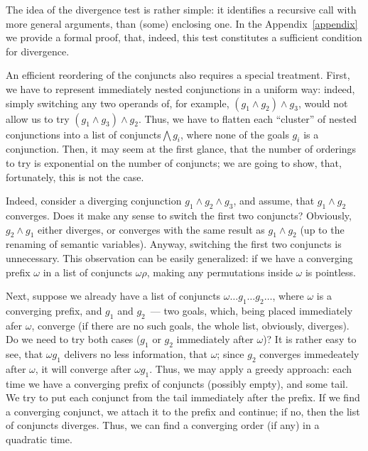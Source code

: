 The idea of the divergence test is rather simple: it identifies a recursive call with more general arguments, 
than (some) enclosing one. In the Appendix~\ref{appendix} we provide a formal proof, that, indeed,
this test constitutes a sufficient condition for divergence.

An efficient reordering of the conjuncts also requires a special treatment. First, we have to represent immediately nested conjunctions in a 
uniform way: indeed, simply switching any two operands of, for example, \mbox{$(g_1\wedge g_2)\wedge g_3$}, would not 
allow us to try \mbox{$(g_1\wedge g_3)\wedge g_2$}. Thus, we have to flatten each ``cluster'' of nested conjunctions into a list of conjuncts\mbox{$\bigwedge g_i$}, 
where none of the goals $g_i$ is a conjunction. Then, it may seem at the first glance, that the number of orderings to try 
is exponential on the number of conjuncts; we are going to show, that, fortunately, this is not the case. 

Indeed, consider a diverging conjunction \mbox{$g_1\wedge g_2\wedge g_3$}, and assume, that \mbox{$g_1\wedge g_2$} converges. 
Does it make any sense to switch the first two conjuncts? Obviously, \mbox{$g_2\wedge g_1$} either diverges, or converges with the same 
result as \mbox{$g_1\wedge g_2$} (up to the renaming of semantic variables). Anyway, switching the first two conjuncts is
unnecessary. This observation can be easily generalized: if we have a converging prefix $\omega$ in a list of conjuncts $\omega\rho$, making
any permutations inside $\omega$ is pointless.

Next, suppose we already have a list of conjuncts \mbox{$\omega\dots g_1\dots g_2\dots$}, where $\omega$ is a converging prefix, and
$g_1$ and $g_2$~--- two goals, which, being placed immediately afer $\omega$, converge (if there are no such
goals, the whole list, obviously, diverges). Do we need to try both cases ($g_1$ or $g_2$ immediately after $\omega$)? 
It is rather easy to see, that \mbox{$\omega g_1$} delivers no less information, that \mbox{$\omega$}; since
$g_2$ converges immedeately after $\omega$, it will converge after \mbox{$\omega g_1$}. Thus, we may apply a greedy approach: each
time we have a converging prefix of conjuncts (possibly empty), and some tail. We try to put each conjunct from the tail 
immediately after the prefix. If we find a converging conjunct, we attach it to the prefix and continue; if no, then the list of 
conjuncts diverges. Thus, we can find a converging order (if any) in a quadratic time.

